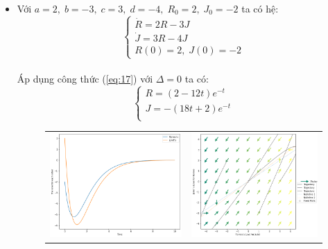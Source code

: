 \documentclass[a4paper]{article}
\begin{document}
\begin{enumerate}
\begin{itemize}
    \item Với $a = 2,\;b = -3,\;c = 3,\;d = -4,\;R_0 = 2,\;J_0 = -2$ ta có hệ:
    $$\begin{cases} \dot{R}=2R-3J \\ \dot{J}=3R-4J \\ R(0)=2,\;J(0)=-2 \end{cases}$$ \\
    Áp dụng công thức (\ref{eq:17}) với $\Delta = 0$ ta có:
    $$\begin{cases}
        R = \left( 2 - 12t \right)e^{-t} \\
        J = -\left( 18t + 2 \right)e^{-t} \\
    \end{cases}$$
    \begin{figure}[htp]
        \centering
        \begin{tabular}{cc}
            \includegraphics[scale = .33]{Images/Bt2/5.1_gr.png} &
            \includegraphics[scale = .33]{Images/Bt2/5.1_phase.png} \\

\end{tabular}
\end{figure}
\end{itemize}
\end{enumerate}
\end{document}
